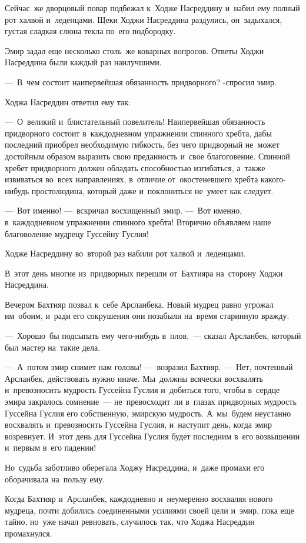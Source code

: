 \documentclass[12pt,a4paper]{book}
\begin{document}
Сейчас~же дворцовый повар подбежал к~Ходже Насреддину и~набил ему полный рот халвой и~леденцами. Щеки Ходжи Насреддина раздулись, он~задыхался, густая сладкая слюна текла по~его подбородку.

Эмир задал еще несколько столь~же коварных вопросов. Ответы Ходжи Насреддина были каждый раз наилучшими.

—~В~чем состоит наипервейшая обязанность придворного? -спросил эмир.

Ходжа Насреддин ответил ему так:

—~О~великий и~блистательный повелитель! Наипервейшая обязанность придворного состоит в~каждодневном упражнении спинного хребта, дабы последний приобрел необходимую гибкость, без чего придворный не~может достойным образом выразить свою преданность и~свое благоговение. Спинной хребет придворного должен обладать способностью изгибаться, а~также извиваться во~всех направлениях, в~отличие от~окостеневшего хребта какого-нибудь простолюдина, который даже и~поклониться не~умеет как следует.

—~Вот именно! —~вскричал восхищенный эмир. —~Вот именно, в~каждодневном упражнении спинного хребта! Вторично объявляем наше благоволение мудрецу Гуссейну Гуслия!

Ходже Насреддину во~второй раз набили рот халвой и~леденцами.

В~этот день многие из~придворных перешли от~Бахтияра на~сторону Ходжи Насреддина.

Вечером Бахтияр позвал к~себе Арсланбека. Новый мудрец равно угрожал им~обоим, и~ради его сокрушения они позабыли на~время старинную вражду.

—~Хорошо~бы подсыпать ему чего-нибудь в~плов,~— сказал Арсланбек, который был мастер на~такие дела.

—~А~потом эмир снимет нам головы! —~возразил Бахтияр. —~Нет, почтенный Арсланбек, действовать нужно иначе. Мы~должны всячески восхвалять и~превозносить мудрость Гуссейна Гуслия и~добиться того, чтобы в~сердце эмира закралось сомнение~— не~превосходит~ли в~глазах придворных мудрость Гуссейна Гуслия его собственную, эмирскую мудрость. А~мы~будем неустанно восхвалять и~превозносить Гуссейна Гуслия, и~наступит день, когда эмир возревнует. И~этот день для Гуссейна Гуслия будет последним в~его возвышении и~первым в~его падении!

Но~судьба заботливо оберегала Ходжу Насреддина, и~даже промахи его оборачивала на~пользу ему.

Когда Бахтияр и~Арсланбек, каждодневно и~неумеренно восхваляя нового мудреца, почти добились соединенными усилиями своей цели и~эмир, пока еще тайно, но~уже начал ревновать, случилось так, что Ходжа Насреддин промахнулся.
\end{document}
